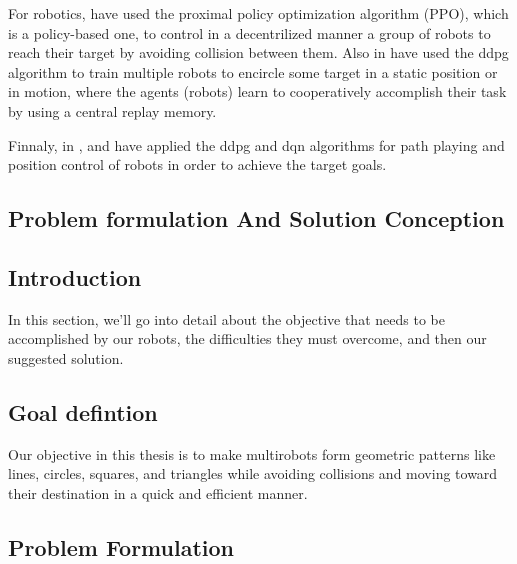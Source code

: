 \documentclass[12pt]{extarticle}
\begin{document}
For robotics, \cite{long2018towards} have used the proximal policy optimization algorithm (PPO), which is a policy-based one, to control in a decentrilized manner a group of robots to reach their target by avoiding collision between them. Also in \cite{ma2020multi} have used the ddpg algorithm to train multiple robots to encircle some target in a static position or in motion, where the agents (robots) learn to cooperatively accomplish their task by using a central replay memory.

Finnaly, in \cite{dong2020mobile},\cite{gong2022efficient} and \cite{quiroga2022position} have applied the ddpg and dqn algorithms for path playing and position control of robots in order to achieve the target goals.





 

  
  
  
\newpage
\pagebreak
\hspace{0pt}
\vfill
\begin{center}
\section{Problem formulation And Solution Conception}
\end{center}
\vfill
\hspace{0pt}

\pagebreak

 

\subsection{Introduction}
In this section, we'll go into detail about the objective that needs to be accomplished by our robots, the difficulties they must overcome, and then our suggested solution.
\subsection{Goal defintion}
Our objective in this thesis is to make multirobots form geometric patterns like lines, circles, squares, and triangles while avoiding collisions and moving toward their destination in a quick and efficient manner. 



\subsection{Problem Formulation}
 
\end{document}
